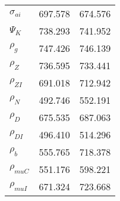 \begin{center}
\begin{longtable}{lcc}
$ {\sigma_{ai}}        $	 & 	     697.578	 & 	     674.576 \\ 
$ {\Psi_{K}}           $	 & 	     738.293	 & 	     741.952 \\ 
$ {\rho_g}             $	 & 	     747.426	 & 	     746.139 \\ 
$ {\rho_Z}             $	 & 	     736.595	 & 	     733.441 \\ 
$ {\rho_{ZI}}          $	 & 	     691.018	 & 	     712.942 \\ 
$ {\rho_N}             $	 & 	     492.746	 & 	     552.191 \\ 
$ {\rho_D}             $	 & 	     675.535	 & 	     687.063 \\ 
$ {\rho_{DI}}          $	 & 	     496.410	 & 	     514.296 \\ 
$ {\rho_b}             $	 & 	     555.765	 & 	     718.378 \\ 
$ {\rho_{muC}}         $	 & 	     551.176	 & 	     598.221 \\ 
$ {\rho_{muI}}         $	 & 	     671.324	 & 	     723.668 \\ 
\end{longtable}
 \end{center}
